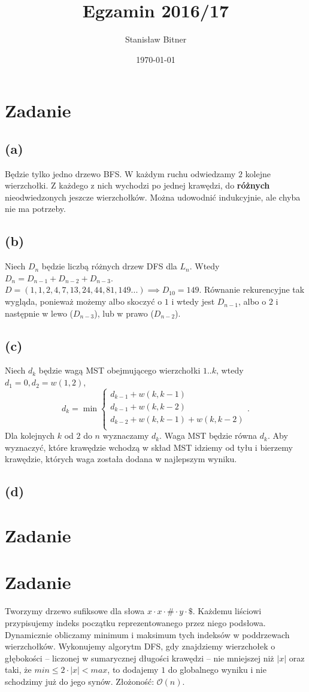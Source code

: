 \documentclass[12pt, a4paper]{article}
\title{Egzamin 2016/17}
\author{Stanisław Bitner}
\date{\today}
\newcommand{\MCALO}{\mathcal{O}}
\newcounter{zadanie}
\newcommand{\zadanie}{\addtocounter{zadanie}{1}\section*{Zadanie \arabic{zadanie}}}
\begin{document}
\maketitle
\zadanie{}
\subsection*{(a)}
Będzie tylko jedno drzewo BFS. W każdym ruchu odwiedzamy $2$ kolejne
wierzchołki. Z każdego z nich wychodzi po jednej krawędzi, do \textbf{różnych}
nieodwiedzonych jeszcze wierzchołków. Można udowodnić indukcyjnie, ale chyba
nie ma potrzeby.

\subsection*{(b)}
Niech $D_n$ będzie liczbą różnych drzew DFS dla $L_n$. Wtedy
$D_n = D_{n-1} + D_{n-2} + D_{n-3}$.\\ $D = (1,1,2,4,7,13,24,44,81,149...)
\implies D_{10} = 149$. Równanie rekurencyjne tak wygląda, ponieważ możemy albo
skoczyć o $1$ i wtedy jest $D_{n-1}$, albo o $2$ i następnie w lewo
($D_{n-3}$), lub w prawo ($D_{n-2}$).

\subsection*{(c)}
Niech $d_k$ będzie wagą MST obejmującego wierzchołki $1..k$, wtedy $d_1 = 0,
d_2 = w(1,2)$,
$$
d_k = \min\begin{cases}
        d_{k-1} + w(k,k-1)\\
        d_{k-1} + w(k,k-2)\\
        d_{k-2} + w(k,k-1) + w(k,k-2)\\
      \end{cases}
.
$$
Dla kolejnych $k$ od $2$ do $n$ wyznaczamy $d_k$. Waga MST będzie równa $d_k$.
Aby wyznaczyć, które krawędzie wchodzą w skład MST idziemy od tyłu i bierzemy
krawędzie, których waga została dodana w najlepszym wyniku.

\subsection*{(d)}

\zadanie{}

\zadanie{}
Tworzymy drzewo sufiksowe dla słowa $x \cdot x \cdot \# \cdot y \cdot \$$.
Każdemu liściowi przypisujemy indeks początku reprezentowanego przez niego
podsłowa. Dynamicznie obliczamy minimum i maksimum tych indeksów w poddrzewach
wierzchołków. Wykonujemy algorytm DFS, gdy znajdziemy wierzchołek o głębokości
-- liczonej w sumarycznej długości krawędzi -- nie mniejszej niż $|x|$ oraz
taki, że $min \le 2 \cdot |x| < max$, to dodajemy $1$ do globalnego wyniku
i nie schodzimy już do jego synów.
Złożoność: $\MCALO(n)$.
\end{document}
